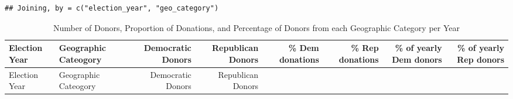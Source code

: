 \documentclass[10pt,]{article}
\begin{document}
\begin{verbatim}
## Joining, by = c("election_year", "geo_category")
\end{verbatim}

\begin{longtable}[]{@{}llrrrrrr@{}}
\caption{Number of Donors, Proportion of Donations, and Percentage of
Donors from each Geographic Category per Year}\tabularnewline
\toprule
\begin{minipage}[b]{0.07\columnwidth}\raggedright
Election Year\strut
\end{minipage} & \begin{minipage}[b]{0.17\columnwidth}\raggedright
Geographic Cateogory\strut
\end{minipage} & \begin{minipage}[b]{0.09\columnwidth}\raggedleft
Democratic Donors\strut
\end{minipage} & \begin{minipage}[b]{0.09\columnwidth}\raggedleft
Republican Donors\strut
\end{minipage} & \begin{minipage}[b]{0.08\columnwidth}\raggedleft
\% Dem donations\strut
\end{minipage} & \begin{minipage}[b]{0.08\columnwidth}\raggedleft
\% Rep donations\strut
\end{minipage} & \begin{minipage}[b]{0.11\columnwidth}\raggedleft
\% of yearly Dem donors\strut
\end{minipage} & \begin{minipage}[b]{0.11\columnwidth}\raggedleft
\% of yearly Rep donors\strut
\end{minipage}\tabularnewline
\midrule
\endfirsthead
\toprule
\begin{minipage}[b]{0.07\columnwidth}\raggedright
Election Year\strut
\end{minipage} & \begin{minipage}[b]{0.17\columnwidth}\raggedright
Geographic Cateogory\strut
\end{minipage} & \begin{minipage}[b]{0.09\columnwidth}\raggedleft
Democratic Donors\strut
\end{minipage} & \begin{minipage}[b]{0.09\columnwidth}\raggedleft
Republican Donors\strut
\end{minipage} & \begin{minipage}[b]{0.08\columnwidth}\raggedleft

\end{minipage}
\end{longtable}
\end{document}
